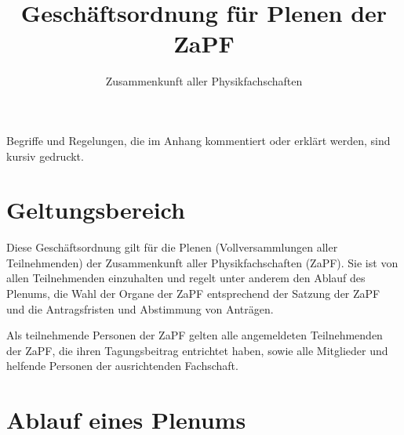 \documentclass[
  a4paper,
  oneside]{scrartcl}
\title{Geschäftsordnung für Plenen der ZaPF}
\author{Zusammenkunft aller Physikfachschaften}
\date{}
\begin{document}
\maketitle

Begriffe und Regelungen, die im Anhang kommentiert oder erklärt werden,
sind kursiv gedruckt.

\section{Geltungsbereich}\label{geltungsbereich}

Diese Geschäftsordnung gilt für die Plenen (Vollversammlungen aller
Teilnehmenden) der Zusammenkunft aller Physikfachschaften (ZaPF). Sie
ist von allen Teilnehmenden einzuhalten und regelt unter anderem den
Ablauf des Plenums, die Wahl der Organe der ZaPF entsprechend der
Satzung der ZaPF und die Antragsfristen und Abstimmung von Anträgen.

Als teilnehmende Personen der ZaPF gelten alle angemeldeten
Teilnehmenden der ZaPF, die ihren Tagungsbeitrag entrichtet haben, sowie
alle Mitglieder und helfende Personen der ausrichtenden Fachschaft.

\section{Ablauf eines Plenums}\label{ablauf-eines-plenums}
\end{document}
